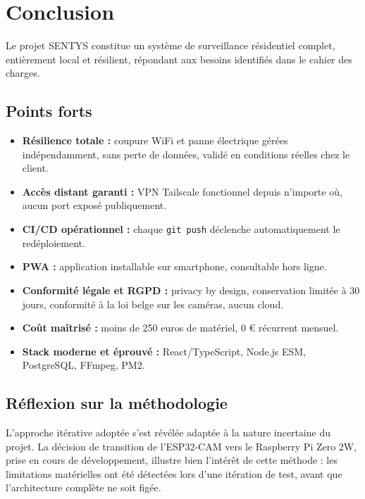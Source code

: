 \documentclass[12pt,a4paper]{article}
\begin{document}
\section{Conclusion}

Le projet SENTYS constitue un système de surveillance résidentiel complet, entièrement local et résilient, répondant aux besoins identifiés dans le cahier des charges.
\subsection{Points forts}

\begin{itemize}[label=\textbullet]
    \item \textbf{Résilience totale :} coupure WiFi et panne électrique gérées indépendamment, sans perte de données, validé en conditions réelles chez le client.
    \item \textbf{Accès distant garanti :} VPN Tailscale fonctionnel depuis n'importe où, aucun port exposé publiquement.
    \item \textbf{CI/CD opérationnel :} chaque \texttt{git push} déclenche automatiquement le redéploiement.
    \item \textbf{PWA :} application installable sur smartphone, consultable hors ligne.
    \item \textbf{Conformité légale et RGPD :} privacy by design, conservation limitée à 30 jours, conformité à la loi belge sur les caméras, aucun cloud.
    \item \textbf{Coût maîtrisé :} moins de 250 euros de matériel, 0 € récurrent mensuel.
    \item \textbf{Stack moderne et éprouvé :} React/TypeScript, Node.js ESM, PostgreSQL, FFmpeg, PM2.
\end{itemize}

\subsection{Réflexion sur la méthodologie}

L'approche itérative adoptée s'est révélée adaptée à la nature incertaine du projet. La décision de transition de l'ESP32-CAM vers le Raspberry Pi Zero 2W, prise en cours de développement, illustre bien l'intérêt de cette méthode : les limitations matérielles ont été détectées lors d'une itération de test, avant que l'architecture complète ne soit figée.
\end{document}
